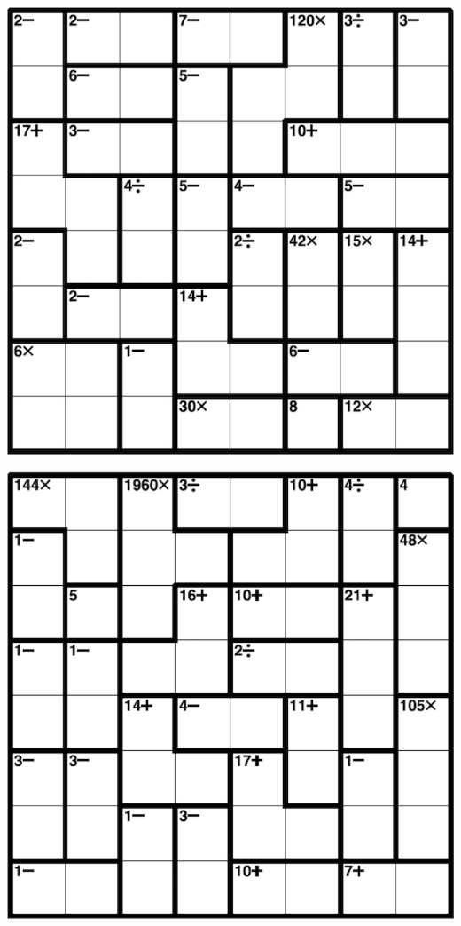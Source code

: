 
\includegraphics[scale=1]{Gambar/Lampiran/8x8_9.png}

\includegraphics[scale=1]{Gambar/Lampiran/8x8_10.png}
